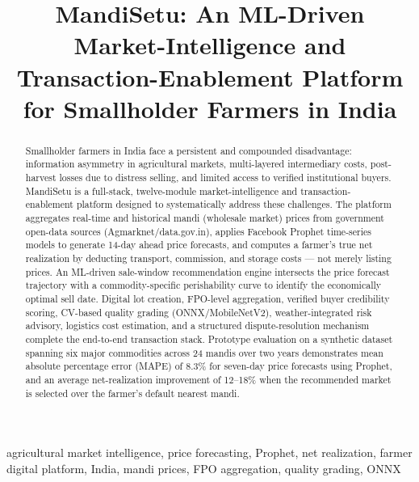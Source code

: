 \documentclass[conference]{IEEEtran}
\begin{document}
\title{MandiSetu: An ML-Driven Market-Intelligence and Transaction-Enablement Platform for Smallholder Farmers in India}

\author{
}

\maketitle

\begin{abstract}
Smallholder farmers in India face a persistent and compounded disadvantage: information asymmetry in agricultural markets, multi-layered intermediary costs, post-harvest losses due to distress selling, and limited access to verified institutional buyers. MandiSetu is a full-stack, twelve-module market-intelligence and transaction-enablement platform designed to systematically address these challenges. The platform aggregates real-time and historical mandi (wholesale market) prices from government open-data sources (Agmarknet/data.gov.in), applies Facebook Prophet time-series models to generate 14-day ahead price forecasts, and computes a farmer's true net realization by deducting transport, commission, and storage costs — not merely listing prices. An ML-driven sale-window recommendation engine intersects the price forecast trajectory with a commodity-specific perishability curve to identify the economically optimal sell date. Digital lot creation, FPO-level aggregation, verified buyer credibility scoring, CV-based quality grading (ONNX/MobileNetV2), weather-integrated risk advisory, logistics cost estimation, and a structured dispute-resolution mechanism complete the end-to-end transaction stack. Prototype evaluation on a synthetic dataset spanning six major commodities across 24 mandis over two years demonstrates mean absolute percentage error (MAPE) of 8.3\% for seven-day price forecasts using Prophet, and an average net-realization improvement of 12–18\% when the recommended market is selected over the farmer's default nearest mandi.
\end{abstract}

\begin{IEEEkeywords}
agricultural market intelligence, price forecasting, Prophet, net realization, farmer digital platform, India, mandi prices, FPO aggregation, quality grading, ONNX
\end{IEEEkeywords}
\end{document}
